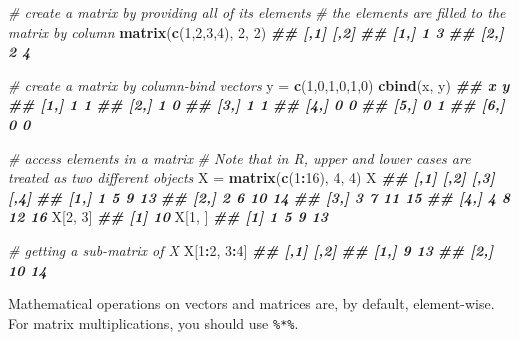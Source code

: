\documentclass[
]{book}
\newenvironment{Shaded}{\begin{snugshade}}{\end{snugshade}}
\newcommand{\CommentTok}[1]{\textcolor[rgb]{0.56,0.35,0.01}{\textit{#1}}}
\newcommand{\DecValTok}[1]{\textcolor[rgb]{0.00,0.00,0.81}{#1}}
\newcommand{\DocumentationTok}[1]{\textcolor[rgb]{0.56,0.35,0.01}{\textbf{\textit{#1}}}}
\newcommand{\FunctionTok}[1]{\textcolor[rgb]{0.13,0.29,0.53}{\textbf{#1}}}
\newcommand{\NormalTok}[1]{#1}
\newcommand{\OtherTok}[1]{\textcolor[rgb]{0.56,0.35,0.01}{#1}}
\newcommand{\SpecialCharTok}[1]{\textcolor[rgb]{0.81,0.36,0.00}{\textbf{#1}}}
\theoremstyle{definition}
\theoremstyle{definition}
\theoremstyle{definition}
\theoremstyle{definition}
\theoremstyle{remark}
\begin{document}
\begin{Shaded}
\begin{Highlighting}[]
    \CommentTok{\# create a matrix by providing all of its elements}
    \CommentTok{\# the elements are filled to the matrix by column}
    \FunctionTok{matrix}\NormalTok{(}\FunctionTok{c}\NormalTok{(}\DecValTok{1}\NormalTok{,}\DecValTok{2}\NormalTok{,}\DecValTok{3}\NormalTok{,}\DecValTok{4}\NormalTok{), }\DecValTok{2}\NormalTok{, }\DecValTok{2}\NormalTok{)}
\DocumentationTok{\#\#      [,1] [,2]}
\DocumentationTok{\#\# [1,]    1    3}
\DocumentationTok{\#\# [2,]    2    4}
  
    \CommentTok{\# create a matrix by column{-}bind vectors}
\NormalTok{    y }\OtherTok{=} \FunctionTok{c}\NormalTok{(}\DecValTok{1}\NormalTok{,}\DecValTok{0}\NormalTok{,}\DecValTok{1}\NormalTok{,}\DecValTok{0}\NormalTok{,}\DecValTok{1}\NormalTok{,}\DecValTok{0}\NormalTok{)}
    \FunctionTok{cbind}\NormalTok{(x, y)}
\DocumentationTok{\#\#      x y}
\DocumentationTok{\#\# [1,] 1 1}
\DocumentationTok{\#\# [2,] 1 0}
\DocumentationTok{\#\# [3,] 1 1}
\DocumentationTok{\#\# [4,] 0 0}
\DocumentationTok{\#\# [5,] 0 1}
\DocumentationTok{\#\# [6,] 0 0}
  
    \CommentTok{\# access elements in a matrix}
    \CommentTok{\# Note that in R, upper and lower cases are treated as two different objects}
\NormalTok{    X }\OtherTok{=} \FunctionTok{matrix}\NormalTok{(}\FunctionTok{c}\NormalTok{(}\DecValTok{1}\SpecialCharTok{:}\DecValTok{16}\NormalTok{), }\DecValTok{4}\NormalTok{, }\DecValTok{4}\NormalTok{)}
\NormalTok{    X}
\DocumentationTok{\#\#      [,1] [,2] [,3] [,4]}
\DocumentationTok{\#\# [1,]    1    5    9   13}
\DocumentationTok{\#\# [2,]    2    6   10   14}
\DocumentationTok{\#\# [3,]    3    7   11   15}
\DocumentationTok{\#\# [4,]    4    8   12   16}
\NormalTok{    X[}\DecValTok{2}\NormalTok{, }\DecValTok{3}\NormalTok{]}
\DocumentationTok{\#\# [1] 10}
\NormalTok{    X[}\DecValTok{1}\NormalTok{, ]}
\DocumentationTok{\#\# [1]  1  5  9 13}
    
    \CommentTok{\# getting a sub{-}matrix of X}
\NormalTok{    X[}\DecValTok{1}\SpecialCharTok{:}\DecValTok{2}\NormalTok{, }\DecValTok{3}\SpecialCharTok{:}\DecValTok{4}\NormalTok{]}
\DocumentationTok{\#\#      [,1] [,2]}
\DocumentationTok{\#\# [1,]    9   13}
\DocumentationTok{\#\# [2,]   10   14}
\end{Highlighting}
\end{Shaded}

Mathematical operations on vectors and matrices are, by default, element-wise. For matrix multiplications, you should use \texttt{\%*\%}.
\end{document}
